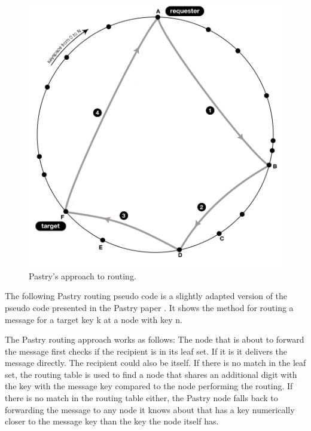 \begin{figure}[!htb]
\begin{center}
	\includegraphics[width=0.9\linewidth]{illustrations/PastryRoutingSuccess.png}
  \caption{Pastry's approach to routing.}
  \label{figRoutingPastry}
\end{center}
\end{figure}

The following Pastry routing pseudo code is a slightly adapted version of the pseudo code presented in the Pastry paper \cite{pastry}.
It shows the method for routing a message for a target key k at a node with key n.

The Pastry routing approach works as follows: The node that is about to forward the message first checks if the recipient is in its leaf set. If it is it delivers the message directly. The recipient could also be itself.
If there is no match in the leaf set, the routing table is used to find a node that shares an additional digit with the key with the message key compared to the node performing the routing. If there is no match in the routing table either, the Pastry node falls back to forwarding the message to any node it knows about that has a key numerically closer to the message key than the key the node itself has.



